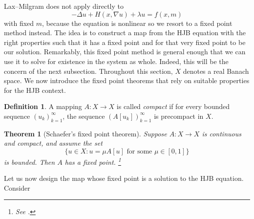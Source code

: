 \documentclass[11pt]{article}
\numberwithin{equation}{section}
\newtheorem{theorem}{Theorem}[section]
\theoremstyle{definition}
\newtheorem{definition}[definition]{Definition}
\theoremstyle{remark}
\begin{document}
Lax--Milgram does not apply directly to
\[-\Delta u + H(x,\nabla u) + \lambda u = f(x,m)\]
with fixed $m$, because the equation is nonlinear so we resort to a fixed point method instead. The idea is to construct a map from the HJB equation with the right properties such that 
it has a fixed point and for that very fixed point to be our solution. Remarkably, this fixed point method is general enough that we can 
use it to solve for existence in the system as whole. Indeed, this will be the concern of the next subsection. Throughout this section, $X$ denotes a real Banach space.
We now introduce the fixed point theorems that rely on suitable properties for the HJB context.

\begin{definition}
A mapping $A:X\to X$ is called \emph{compact} if for every bounded sequence $(u_k)_{k=1}^\infty$,
the sequence $(A[u_k])_{k=1}^\infty$ is precompact in $X$.
\end{definition}

\begin{theorem}[Schaefer's fixed point theorem]
  \label{thm:schaefer}
  Suppose $A:X\to X$ is continuous and compact, and assume the set
  \[\{u\in X: u=\mu A[u] \text{ for some } \mu \in [0,1]\}\]
  is bounded. Then $A$ has a fixed point. \footnote{See \cite[Section~9.2]{evans_pde}.}
\end{theorem}

Let us now design the map whose fixed point is a solution to the HJB equation. 
Consider
\end{document}
